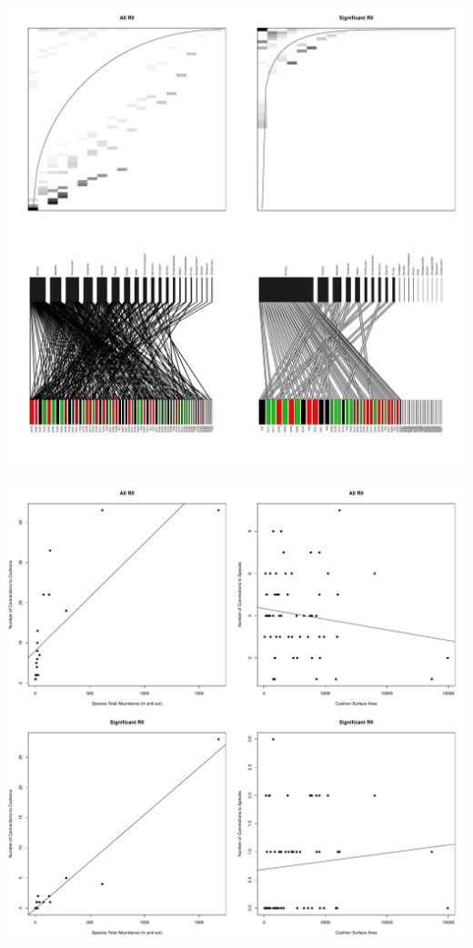 \documentclass[12pt]{article}
\begin{document}
\includegraphics{O_cornuta_ms-006}



\includegraphics{O_cornuta_ms-008}
\end{document}
